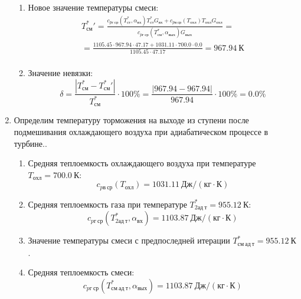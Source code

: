 \documentclass[a4paper,12pt]{article}
\begin{document}
\begin{enumerate}
\begin{enumerate}
            \item Новое значение температуры смеси:
            \begin{gather*}
                T_{см}^*\prime = \frac{
                        c_{pг\ ср} (T_{ст}^*, \alpha_{вх}) T_{ст}^* G_{вх} + c_{pв\ ср} (T_{охл}) T_{охл} G_{охл}
                    }{
                        c_{pг\ ср} (T_{см}^{*}, \alpha_{вых}) G_{вых}
                    } =\\
                = \frac{
                    1105.45
                    \cdot 967.94 \cdot 47.17 +
                    1031.11
                    \cdot 700.0 \cdot 0.0
                }{
                    1105.45
                    \cdot  47.17
                } =
                967.94\ К\\
            \end{gather*}

            \item Значение невязки:
            \[
                \delta = \frac{ \left| T_{см}^{*} - T_{см}^*\prime \right| }{T_{см}^{*}} \cdot 100 \% =
                    \frac{
                        \left| 967.94 - 967.94 \right|
                    }{
                        967.94
                    } \cdot 100 \% =
                0.0 \%
            \]
        \end{enumerate}


        \item Определим температуру торможения на выходе из ступени после подмешивания охлаждающего воздуха при адиабатическом процессе в турбине..
        \begin{enumerate}

            \item Средняя теплоемкость охлаждающего воздуха при температуре $T_{охл} = 700.0\ К $:
            \[
                c_{pв\ ср} (T_{охл}) = 1031.11\ Дж/ (кг \cdot К)
            \]

            \item Средняя теплоемкость газа при температуре $T_{2ад\ т}^* = 955.12 \ К $:
            \[
                c_{pг\ ср} (T_{2ад\ т}^*, \alpha_{вх}) =
                1103.87\ Дж/ (кг \cdot К)
            \]

            \item Значение температуры смеси с предпоследней итерации $T_{см\ ад\ т}^{*} = 955.12\ К$.

            \item Средняя теплоемкость смеси:
            \[
                c_{pг\ ср} (T_{см\ ад\ т}^{*}, \alpha_{вых}) =
                1103.87\ Дж/ (кг \cdot К)
            \]


\end{enumerate}
\end{enumerate}
\end{document}
